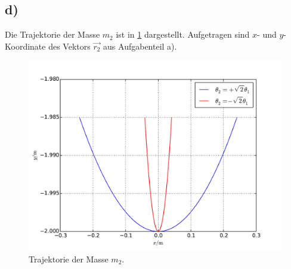 \subsection*{d)}
Die Trajektorie der Masse $m_2$ ist in \cref{fig:Trajektorie} dargestellt.
Aufgetragen sind $x$- und $y$-Koordinate des Vektors $\vec{r_2}$ aus Aufgabenteil a).
\begin{figure}[h!]
	\includegraphics[width = \textwidth]{../Plots/Plot_1_D_trajektorie.pdf}
	\caption{Trajektorie der Masse $m_2$.\label{fig:Trajektorie}}
\end{figure}
